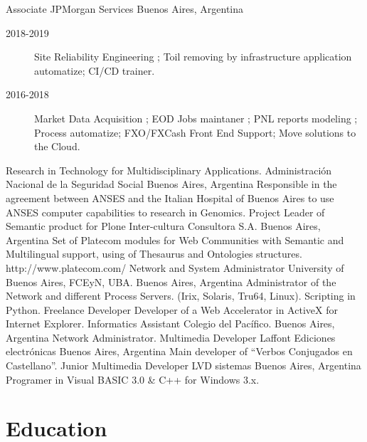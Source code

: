 \documentclass[9pt,a4paper,sans]{moderncv}
\newcommand{\UBA}{University of Buenos Aires}
\begin{document}
	{Associate}
	{JPMorgan Services}
	{Buenos Aires, Argentina}
	{}
	{\begin{description}
	 \item [2018-2019] Site Reliability Engineering ; Toil removing by infrastructure application automatize; CI/CD trainer.
	 \item [2016-2018] Market Data Acquisition ; EOD Jobs maintaner ; PNL reports modeling ; Process automatize; FXO/FXCash Front End Support; Move solutions to the Cloud.
         \end{description}}
	{Research in Technology for Multidisciplinary Applications.}
	{Administración Nacional de la Seguridad Social}
	{Buenos Aires, Argentina}
	{}
	{Responsible in the agreement between ANSES and the Italian Hospital of Buenos Aires to use ANSES computer capabilities to research in Genomics.}
	{Project Leader of Semantic product for Plone}
	{Inter-cultura Consultora S.A.}
	{Buenos Aires, Argentina}
	{}
	{Set of Platecom modules for Web Communities with Semantic and Multilingual support, using of Thesaurus and Ontologies structures.  http://www.platecom.com/}
	{Network and System Administrator}
	{\UBA, FCEyN, UBA.}
	{Buenos Aires, Argentina}
	{}
	{Administrator of the Network and different Process Servers. (Irix, Solaris, Tru64, Linux). Scripting in Python.}
	{Freelance Developer}
	{}
	{}
	{}
	{Developer of a Web Accelerator in ActiveX for Internet Explorer.}
	{Informatics Assistant}
	{Colegio del Pacífico.}
	{Buenos Aires, Argentina}
	{}
	{Network Administrator. }
	{Multimedia Developer}
	{Laffont Ediciones electrónicas}
	{Buenos Aires, Argentina}
	{}
	{Main developer of ``Verbos Conjugados en Castellano''.}
	{Junior Multimedia Developer}
	{LVD sistemas}
	{Buenos Aires, Argentina}
	{}
	{Programer in Visual BASIC 3.0 \& C++ for Windows 3.x.}
\label{profesional:hasta}


\section{Education}\label{otros:desde}
\end{document}
